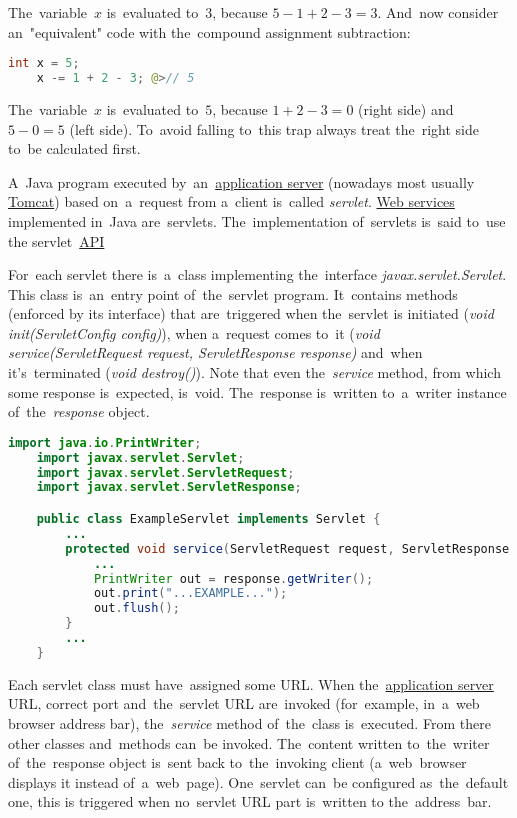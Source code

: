 \noindent The~variable~$x$ is~evaluated to~$3$, because $5-1+2-3=3$.
And~now consider an~"equivalent" code with the~compound assignment subtraction:
\begin{lstlisting}[language=Java, frame=no]
    int x = 5;
    x -= 1 + 2 - 3; @>// 5
\end{lstlisting}

\noindent The~variable~$x$ is~evaluated to~$5$, because $1+2-3=0$ (right side) and~$5-0=5$ (left side).
To~avoid falling to~this trap always treat the~right side to~be calculated first.

\label{serialization}

\label{servlet}
A~Java program executed by~an~\hyperref[applicationserver]{application server} (nowadays most usually \hyperref[tomcat]{Tomcat}) based on~a~request from a~client is~called \textit{servlet}. \hyperref[webserviceapplication]{Web services} implemented in~Java are~servlets.
The~implementation of~servlets is~said to~use the servlet~\hyperref[api]{API}

For~each servlet there is~a~class implementing the~interface \textit{javax.servlet.Servlet}.
This class is~an~entry point of~the~servlet program.
It~contains methods (enforced by its interface) that are~triggered when the~servlet is initiated (\textit{void init(ServletConfig config)}), when a~request comes to~it (\textit{void service(ServletRequest request, ServletResponse response)} and~when it's~terminated (\textit{void destroy()}).
Note that even the~\textit{service} method, from which some response is~expected, is~void.
The~response is~written to~a~writer instance of~the~\textit{response} object.

\enlargethispage{10mm}
\example
\begin{lstlisting}[language=Java]
    import java.io.PrintWriter;
    import javax.servlet.Servlet;
    import javax.servlet.ServletRequest;
    import javax.servlet.ServletResponse;

    public class ExampleServlet implements Servlet {
        ...
        protected void service(ServletRequest request, ServletResponse response) {
            ...
            PrintWriter out = response.getWriter();
            out.print("...EXAMPLE...");
            out.flush();
        }
        ...
    }
\end{lstlisting}

\noindent Each servlet class must have~assigned some URL.
When the~\hyperref[applicationserver]{application server} URL, correct port and~the~servlet URL are~invoked (for~example, in~a~web browser address bar), the~\textit{service} method of~the~class is~executed.
From there other classes and~methods can~be invoked.
The~content written to~the~writer of~the~response object is~sent back to~the~invoking client (a~web~browser displays it instead of~a~web~page).
One~servlet can~be configured as~the~default one, this is triggered when no~servlet URL part is~written to the~address~bar.

